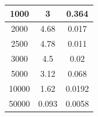 \begin{table} [!htb]
\begin{minipage}{.32\linewidth}
\begin{tabular}{|c|c|c|}
                1000 & 3 & 0.364 \\
                \hline
                2000 & 4.68 & 0.017 \\
                \hline
                2500 & 4.78 & 0.011 \\
                \hline
                3000 & 4.5 & 0.02 \\
                \hline
                5000 & 3.12 & 0.068 \\
                \hline
                10000 & 1.62 & 0.0192 \\
                \hline
                50000 & 0.093 & 0.0058 \\
                \hline
            \end{tabular}
        \end{minipage}
    \end{table}

